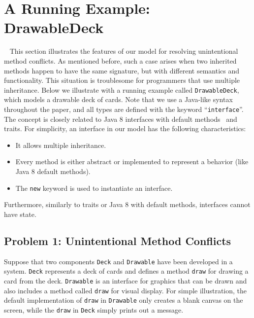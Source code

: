 \section{A Running Example: DrawableDeck}~\label{sec:overview}
This section illustrates the features of our model for
resolving unintentional method conflicts. As mentioned before, such a
case arises when two inherited methods happen to have the same
signature, but with different semantics and functionality. This
situation is troublesome for programmers that use multiple
inheritance. Below we illustrate with a running example called
\lstinline|DrawableDeck|, which models a drawable deck of cards. 
Note that we use a Java-like syntax
throughout the paper, and all types are defined with the keyword
``\lstinline|interface|''. The concept is closely related to Java 8
interfaces with default methods~\cite{bono14} and traits. For simplicity, an interface in our model has
the following characteristics:
\begin{itemize}
  \item It allows multiple inheritance.
  \item Every method is either abstract or implemented to represent a behavior (like Java 8 default methods). 
  \item The \lstinline|new| keyword is used to instantiate an interface.
\end{itemize}
Furthermore, similarly to traits or Java 8 with default methods,
interfaces cannot have state.


\subsection{Problem 1: Unintentional Method Conflicts}
Suppose that two components \lstinline|Deck| and \lstinline|Drawable| 
have been developed in a system. \lstinline|Deck| represents a deck
of cards and defines a method \lstinline|draw| for drawing a card from the
deck.  \lstinline|Drawable| is an interface for graphics that
can be drawn and also includes a method called \lstinline|draw| for
visual display. For simple illustration, the default implementation of
\lstinline|draw| in \lstinline|Drawable| only creates a blank canvas
on the screen, while the \lstinline|draw| in \lstinline|Deck| simply
prints out a message.

